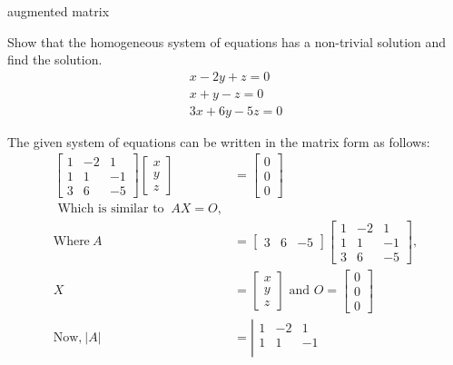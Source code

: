 augmented matrix
\begin{exercise}
	Show that the homogeneous system of equations has a non-trivial solution and find the solution.
	$$
	\begin{array}{r}
		x-2 y+z=0 \\
		x+y-z=0 \\
		3 x+6 y-5 z=0
	\end{array}
	$$
\end{exercise}
\begin{answer}[H]
	The given system of equations can be written in the matrix form as follows:
	\begin{align*}
		\left[\begin{array}{ccc}
			1 & -2 & 1 \\
			1 & 1 & -1 \\
			3 & 6 & -5
		\end{array}\right]\left[\begin{array}{l}
			x \\
			y \\
			z
		\end{array}\right]&=\left[\begin{array}{l}
			0 \\
			0 \\
			0
		\end{array}\right]\\
\text{	Which is similar to }\ A X=O, \\\text{Where}\ A&=\left[\begin{array}{ccc}3 & 6 & -5\end{array}\right]\left[\begin{array}{ccc}1 & -2 & 1 \\ 1 & 1 & -1 \\ 3 & 6 & -5\end{array}\right],\\
	X&=\left[\begin{array}{l}x \\ y \\ z\end{array}\right]\text{ and } O=\left[\begin{array}{l}0 \\ 0 \\ 0\end{array}\right]\\\text{Now,}\
|A|&=\left|\begin{array}{ccc}
			1 & -2 & 1 \\
			1 & 1 & -1 \\

\end{array}
\end{align*}
\end{answer}
